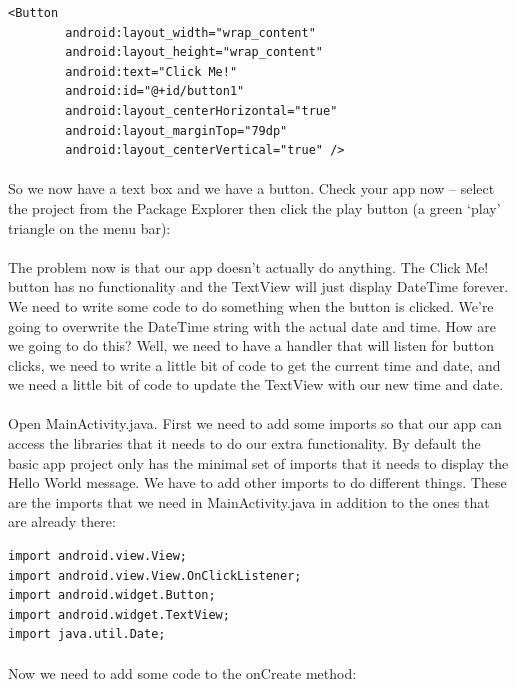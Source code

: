 \begin{lstlisting}
<Button
        android:layout_width="wrap_content"
        android:layout_height="wrap_content"
        android:text="Click Me!"
        android:id="@+id/button1"
        android:layout_centerHorizontal="true"
        android:layout_marginTop="79dp"
        android:layout_centerVertical="true" />
\end{lstlisting}

\paragraph{} So we now have a text box and we have a button. Check your app now – select the project from the Package Explorer then click the play button (a green `play' triangle on the menu bar):

\paragraph{} The problem now is that our app doesn't actually do anything. The Click Me! button has no functionality and the TextView will just display DateTime forever. We need to write some code to do something when the button is clicked. We’re going to overwrite the DateTime string with the actual date and time. How are we going to do this? Well, we need to have a handler that will listen for button clicks, we need to write a little bit of code to get the current time and date, and we need a little bit of code to update the TextView with our new time and date.

\paragraph{} Open MainActivity.java. First we need to add some imports so that our app can access the libraries that it needs to do our extra functionality. By default the basic app project only has the minimal set of imports that it needs to display the Hello World message. We have to add other imports to do different things. These are the imports that we need in MainActivity.java in addition to the ones that are already there:

\begin{lstlisting}
import android.view.View;
import android.view.View.OnClickListener;
import android.widget.Button;
import android.widget.TextView;
import java.util.Date;
\end{lstlisting}

\paragraph{} Now we need to add some code to the onCreate method:

